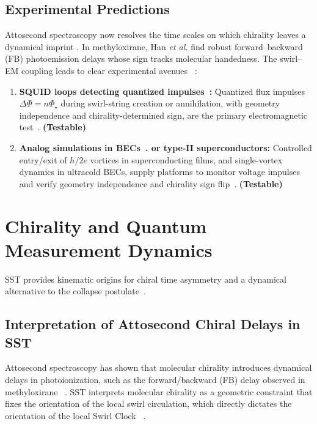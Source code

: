 \documentclass[10pt,reprint,aps,onecolumn,nofootinbib]{revtex4-2}
\newcommand{\testable}{\textbf{(Testable)}}
\begin{document}
    \subsection*{Experimental Predictions}
        Attosecond spectroscopy now resolves the time scales on which chirality leaves a dynamical imprint \cite{Krausz2009,Beaulieu2018}. In methyloxirane, Han \emph{et al.} \cite{Han2025} find robust forward–backward (FB) photoemission delays whose sign tracks molecular handedness.
        The swirl–EM coupling leads to clear experimental avenues~ \cite{EM_G}:
        \begin{enumerate}
        \item \textbf{SQUID loops detecting quantized impulses~\cite{sstAttosecondPhotoionization,DeaverFairbank1961,DollNäbauer1961,ClarkeBraginski2011}:} Quantized flux impulses $\Delta\Phi=n\Phi_\star$ during swirl-string creation or annihilation, with geometry independence and chirality-determined sign, are the primary electromagnetic test~\cite{EM_G}. \testable
        \item \textbf{Analog simulations in BECs~\cite{BarceloLiberatiVisser2011,SchererWeilerNeelyAnderson2007}. or type-II superconductors:} Controlled entry/exit of $h/2e$ vortices in superconducting films, and single-vortex dynamics in ultracold BECs, supply platforms to monitor voltage impulses and verify geometry independence and chirality sign flip~\cite{EM_G}. \testable
        \end{enumerate}

\section{Chirality and Quantum Measurement Dynamics}\label{sec:chirality}
SST provides kinematic origins for chiral time asymmetry and a dynamical alternative to the collapse postulate~\cite{sstCanon}.

    \subsection*{Interpretation of Attosecond Chiral Delays in SST}
        Attosecond spectroscopy has shown that molecular chirality introduces dynamical delays in photoionization, such as the forward/backward (FB) delay observed in methyloxirane~ \cite{Nahon2020}. SST interprets molecular chirality as a geometric constraint that fixes the orientation of the local swirl circulation, which directly dictates the orientation of the local Swirl Clock~ \cite{sstAttosecondPhotoionization}.
\end{document}
